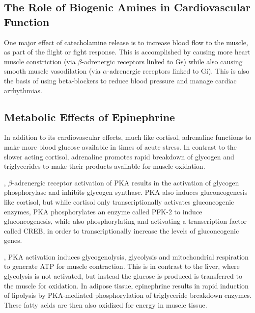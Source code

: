 \documentclass{tufte-handout}
\begin{document}
\subsection{The Role of Biogenic Amines in Cardiovascular Function}

One major effect of catecholamine release is to increase blood flow to the muscle, as part of the flight or fight response.  This is accomplished by causing more heart muscle constriction (via $\beta$-adrenergic receptors linked to Gs) while also causing smooth muscle vasodilation (via $\alpha$-adrenergic receptors linked to Gi).  This is also the basis of using beta-blockers to reduce blood pressure and manage cardiac arrhythmias. 

\subsection{Metabolic Effects of Epinephrine}

In addition to its cardiovascular effects, much like cortisol, adrenaline functions to make more blood glucose available in times of acute stress.  In contrast to the slower acting cortisol, adrenaline promotes rapid breakdown of glycogen and triglycerides to make their products available for muscle oxidation.

, $\beta$-adrenergic receptor activation of PKA results in the activation of glycogen phosphorylase and inhibits glycogen synthase.  PKA also induces gluconeogenesis like cortisol, but while cortisol only  transcriptionally activates gluconeogenic enzymes, PKA phosphorylates an enzyme called PFK-2 to induce gluconeogenesis, while also phosphorylating and activating a transcription factor called CREB, in order to transcriptionally increase the levels of gluconeogenic genes.

, PKA activation induces glycogenolysis, glycolysis and mitochondrial respiration to generate ATP for muscle contraction.  This is in contrast to the liver, where glycolysis is not activated, but instead the glucose is produced is transferred to the muscle for oxidation.  In adipose tissue, epinephrine results in rapid induction of lipolysis by PKA-mediated phosphorylation of triglyceride breakdown enzymes.  These fatty acids are then also oxidized for energy in muscle tissue.
\end{document}
